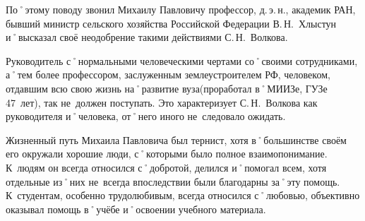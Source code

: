 По˚этому поводу звонил Михаилу Павловичу профессор, д.\,э.\,н., академик РАН, бывший министр сельского хозяйства Российской Федерации В.\,Н.~Хлыстун и˚высказал своё неодобрение такими действиями С.\,Н.~Волкова.

Руководитель с˚нормальными человеческими чертами со˚своими сотрудниками, а˚тем более профессором, заслуженным землеустроителем РФ, человеком, отдавшим всю свою жизнь на˚развитие вуза(проработал в˚МИИЗе, ГУЗе 47~лет), так не~должен поступать. Это характеризует С.\,Н.~Волкова как руководителя и˚человека, от˚него иного не~следовало ожидать.

Жизненный путь Михаила Павловича был тернист, хотя в˚большинстве своём его окружали  хорошие люди, с˚которыми было полное взаимопонимание. К~людям он всегда относился с˚добротой, делился и˚помогал всем, хотя отдельные из˚них не~всегда впоследствии были благодарны за˚эту помощь. К~студентам, особенно трудолюбивым, всегда относился с˚любовью, объективно оказывал помощь в˚учёбе и˚освоении учебного материала.
